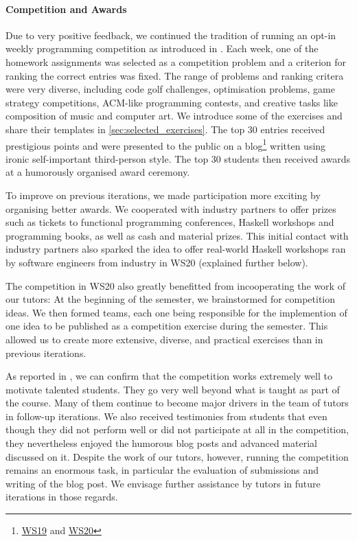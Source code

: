 \paragraph{Competition and Awards}
Due to very positive feedback,
we continued the tradition of running an opt-in weekly
programming competition as introduced in \citep{next_1100}.
Each week, one of the homework assignments
was selected as a competition problem
and a criterion for ranking the correct entries was fixed.
The range of problems and ranking critera were very diverse,
including code golf challenges,
optimisation problems,
game strategy competitions,
ACM-like programming contests,
and creative tasks like composition of music
and computer art.
We introduce some of the exercises and share their templates in \cref{sec:selected_exercises}.
The top 30 entries received prestigious points
and were presented to the public on a blog\footnote{\href{https://www21.in.tum.de/teaching/fpv/WS19/wettbewerb.html}{WS19} and \href{https://www21.in.tum.de/teaching/fpv/WS20/wettbewerb.html}{WS20}}
written using ironic self-important third-person style.
The top 30 students then received awards at
a humorously organised award ceremony.

To improve on previous iterations,
we made participation more exciting by organising better awards.
We cooperated with industry partners
to offer prizes such as tickets to functional programming conferences,
Haskell workshops and programming books, as well as cash and material prizes.
This initial contact with industry partners
also sparked the idea to offer real-world Haskell workshops
ran by software engineers from industry in WS20 (explained further below).

The competition in WS20 also greatly benefitted from incooperating the work of our tutors:
At the beginning of the semester,
we brainstormed for competition ideas.
We then formed teams, each one being responsible for the
implemention of one idea to be published as a competition exercise during the semester.
This allowed us to create more extensive, diverse,
and practical exercises than in previous iterations.

As reported in \citep{next_1100},
we can confirm that the competition works extremely well to motivate talented students.
They go very well beyond what is taught as part of the course.
Many of them continue to become major drivers in
the team of tutors in follow-up iterations.
We also received testimonies from students that even though they did not perform well or did not participate at all in the competition,
they nevertheless enjoyed the humorous blog posts and advanced material discussed on it.
Despite the work of our tutors,
however,
running the competition remains an enormous task,
in particular the evaluation of submissions and
writing of the blog post.
We envisage further assistance by tutors in future iterations in those regards.

